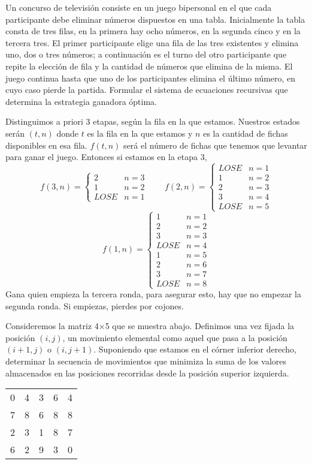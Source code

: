 \documentclass[twoside]{article}
\begin{document}
\newpage 
\begin{ejercicio}{7}
Un concurso de televisión consiste en un juego bipersonal en el que cada participante debe
eliminar números dispuestos en una tabla. Inicialmente la tabla consta de tres filas, en la primera
hay ocho números, en la segunda cinco y en la tercera tres. El primer participante elige una fila de
las tres existentes y elimina uno, dos o tres números; a continuación es el turno del otro participante
que repite la elección de fila y la cantidad de números que elimina de la misma. El juego continua
hasta que uno de los participantes elimina el último número, en cuyo caso pierde la partida.
Formular el sistema de ecuaciones recursivas que determina la estrategia ganadora óptima.
\end{ejercicio}
\begin{solucion}
Distinguimos a priori 3 etapas, según la fila en la que estamos. Nuestros estados serán $(t,n)$ donde $t$ es la fila en la que estamos y $n$ es la cantidad de fichas disponibles en esa fila. $f(t,n)$ será el número de fichas que tenemos que levantar para ganar el juego. Entonces si estamos en la etapa 3, 
$$
f(3,n)=
\begin{cases}
2 & n=3\\
1 & n=2\\
LOSE & n=1
\end{cases}
\qquad
f(2,n)=
\begin{cases}
LOSE & n=1\\
1 & n=2\\
2 & n=3\\
3 & n=4\\
LOSE & n=5
\end{cases}
$$
$$
f(1,n)=
\begin{cases}
1 & n=1\\
2 & n=2\\
3 & n=3\\
LOSE & n=4\\
1 & n=5\\
2 & n=6\\
3 & n=7\\
LOSE & n=8
\end{cases}
$$
Gana quien empieza la tercera ronda, para asegurar esto, hay que no empezar la segunda ronda. Si empiezas, pierdes por cojones.
\end{solucion}
\newpage
\begin{ejercicio}{8} 
Consideremos la matriz 4$\times$5 que se muestra abajo. Definimos una vez fijada la posición $(i, j)$,
un movimiento elemental como aquel que pasa a la posición $(i + 1, j)$ o $(i, j + 1)$. Suponiendo
que estamos en el córner inferior derecho, determinar la secuencia de movimientos que minimiza la
suma de los valores almacenados en las posiciones recorridas desde la posición superior izquierda.
\begin{center}
\begin{tabular}{c c c c c}
0 & 4 & 3 & 6 & 4\\
7 & 8 & 6 & 8 & 8\\
2 & 3 & 1 & 8 & 7\\
6 & 2 & 9 & 3 & 0
\end{tabular}
\end{center}
\end{ejercicio}
\end{document}
